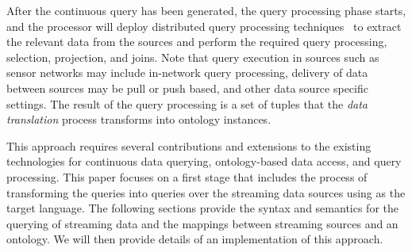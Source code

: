 After the continuous query has been generated, the query processing phase starts, and the processor will deploy distributed query processing techniques~\cite{Kossmann_00} to extract the relevant data from the sources and perform the required query processing, \eg selection, projection, and joins. %
%
Note that query execution in sources such as sensor networks may include in-network query processing, delivery of data between sources may be pull or push based, and other data source specific settings. The result of the query processing is a set of tuples that the \textit{data translation} process transforms into ontology instances.

This approach requires several contributions and extensions to the existing technologies for continuous data querying, ontology-based data access, and \sparql query processing. 
This paper focuses on a first stage that includes the process of transforming the \sparqlstr queries into queries over the streaming data sources using \sneeql as the target language.
The following sections provide the syntax and semantics for the querying of streaming \rdf data and the mappings between streaming sources and an ontology.
We will then provide details of an implementation of this approach.

